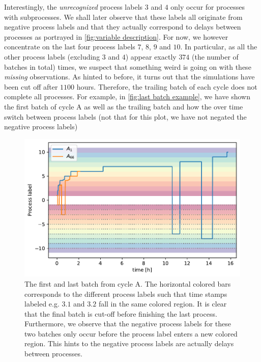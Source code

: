 \documentclass[../Thesis.tex]{subfiles}
\begin{document}

Interestingly, the \textit{unrecognized} process labels $3$ and $4$ only occur for processes with subprocesses. We shall later observe that these labels all originate from negative process labels and that they actually correspond to delays between processes as portrayed in \autoref{fig:variable description}. For now, we however concentrate on the last four process labels $7$, $8$, $9$ and $10$. In particular, as all the other process labels (excluding $3$ and $4$) appear exactly $374$ (the number of batches in total) times, we suspect that something weird is going on with these \textit{missing} observations. As hinted to before, it turns out that the simulations have been cut off after $1100$ hours. Therefore, the trailing batch of each cycle does not complete all processes. For example, in \autoref{fig:last batch example}, we have shown the first batch of cycle A as well as the trailing batch and how the over time switch between process labels (not that for this plot, we have not negated the negative process labels)

\begin{figure}[h]
    \centering
    \includegraphics[width=0.75\linewidth]{figures/Multiple cycles data/tailing batch short.pdf}
    \caption{The first and last batch from cycle A. The horizontal colored bars corresponds to the different process labels such that time stamps labeled e.g. $3.1$ and $3.2$ fall in the same colored region. It is clear that the final batch is cut-off before finishing the last process. Furthermore, we observe that the negative process labels for these two batches only occur before the process label enters a new colored region. This hints to the negative process labels are actually delays between processes.}
    \label{fig:last batch example}
\end{figure}
\end{document}
